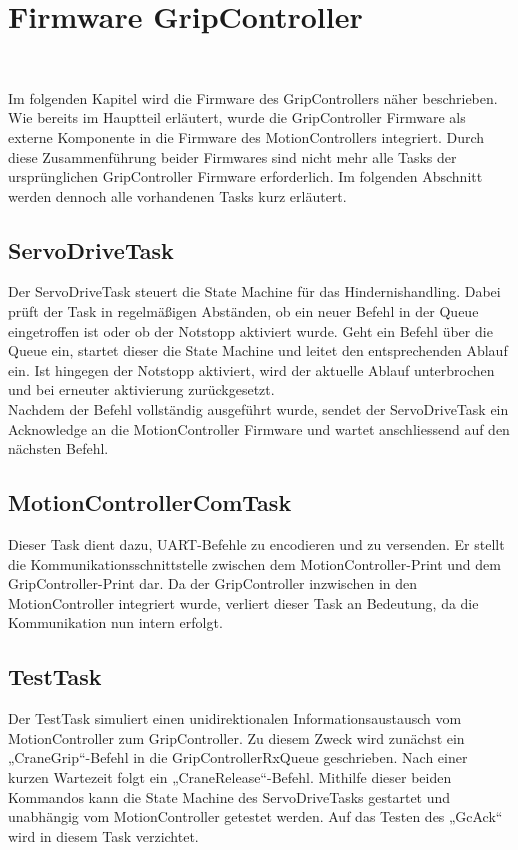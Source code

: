 \documentclass[main.tex]{subfiles} %
\begin{document}

\section{Firmware GripController}~\label{apdx:FirmwareGripController}

Im folgenden Kapitel wird die Firmware des GripControllers näher beschrieben. Wie bereits im Hauptteil
erläutert, wurde die GripController Firmware als externe Komponente in die Firmware des MotionControllers
integriert. Durch diese Zusammenführung beider Firmwares sind nicht mehr alle Tasks der ursprünglichen
GripController Firmware erforderlich. Im folgenden Abschnitt werden dennoch alle vorhandenen Tasks kurz erläutert.

\subsection{ServoDriveTask}
Der ServoDriveTask steuert die State Machine für das Hindernishandling. Dabei prüft der Task in
regelmäßigen Abständen, ob ein neuer Befehl in der Queue eingetroffen ist oder ob der Notstopp
aktiviert wurde. Geht ein Befehl über die Queue ein, startet dieser die State Machine und leitet
den entsprechenden Ablauf ein. Ist hingegen der Notstopp aktiviert, wird der aktuelle Ablauf unterbrochen und 
bei erneuter aktivierung zurückgesetzt.\\
Nachdem der Befehl vollständig ausgeführt wurde, sendet der ServoDriveTask ein Acknowledge an die
MotionController Firmware und wartet anschliessend auf den nächsten Befehl.
\subsection{MotionControllerComTask}
Dieser Task dient dazu, UART-Befehle zu encodieren und zu versenden. Er stellt die Kommunikationsschnittstelle
zwischen dem MotionController-Print und dem GripController-Print dar. Da der GripController inzwischen in den
MotionController integriert wurde, verliert dieser Task an Bedeutung, da die Kommunikation nun intern erfolgt.
\subsection{TestTask}
Der TestTask simuliert einen unidirektionalen Informationsaustausch vom MotionController zum GripController.
Zu diesem Zweck wird zunächst ein „CraneGrip“-Befehl in die GripControllerRxQueue geschrieben. Nach einer
kurzen Wartezeit folgt ein „CraneRelease“-Befehl. Mithilfe dieser beiden Kommandos kann die State Machine
des ServoDriveTasks gestartet und unabhängig vom MotionController getestet werden. Auf das Testen des
„GcAck“ wird in diesem Task verzichtet.
\end{document}
